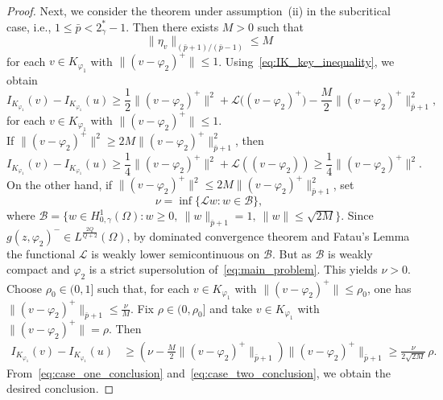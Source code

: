 \documentclass[11pt]{article}
\newcommand{\spacegr}{H^{1}_{0,\gamma}(\Omega)}
\begin{document}
\begin{proof}
Next, we consider the theorem under assumption~\textnormal{(ii)} in the subcritical case, i.e., $1 \le \bar{p} < 2_{\gamma}^{*}-1$. Then there exists $M>0$ such that
\begin{equation*}
\| \eta_{v} \|_{(\bar{p}+1)/(\bar{p}-1)} \le M
\end{equation*}
for each $v \in K_{\varphi_1}$ with $\bigl\| (v-\varphi_2)^{+} \bigr\| \le 1$. Using~\eqref{eq:IK_key_inequality}, we obtain
\begin{equation*}
I_{K_{\varphi_1}}(v) - I_{K_{\varphi_1}}(u)
\ge \frac{1}{2} \bigl\| (v-\varphi_2)^{+} \bigr\|^{2}
+ \mathcal{L}\bigl( (v-\varphi_2)^{+} \bigr)
- \frac{M}{2} \bigl\| (v-\varphi_2)^{+} \bigr\|_{\bar{p}+1}^{2},
\end{equation*}
for each $v \in K_{\varphi_1}$ with $\bigl\| (v-\varphi_2)^{+} \bigr\| \le 1$. \\
If $\bigl\| (v-\varphi_2)^{+} \bigr\|^{2} \ge 2M \bigl\| (v-\varphi_2)^{+} \bigr\|_{\bar{p}+1}^{2}$, then 
\begin{equation}
\label{eq:case_one_conclusion}
I_{K_{\varphi_1}}(v) - I_{K_{\varphi_1}}(u)
\ge \frac{1}{4} \bigl\| (v-\varphi_2)^{+} \bigr\|^{2} + \mathcal{L}((v-\varphi_2)) 
\ge \frac{1}{4} \bigl\| (v-\varphi_2)^{+} \bigr\|^{2}.
\end{equation}
On the other hand, if $\bigl\| (v-\varphi_2)^{+} \bigr\|^{2} \le 2M \bigl\| (v-\varphi_2)^{+} \bigr\|_{\bar{p}+1}^{2}$, set
\begin{equation*}
\nu = \inf \{ \mathcal{L}w : w \in \mathcal{B} \},
\end{equation*}
where $\mathcal{B} = \{ w \in \spacegr : w \ge 0,\ \| w \|_{\bar{p}+1} = 1,\ \| w \| \le \sqrt{2M} \}$. Since $g(z,\varphi_2)^{-} \in L^{\frac{2Q}{Q+2}}(\Omega)$, by dominated convergence theorem and Fatau's Lemma the functional $\mathcal{L}$ is weakly lower semicontinuous on $\mathcal{B}$. But as $\mathcal{B}$ is weakly compact and  $\varphi_2$ is a strict supersolution of~\eqref{eq:main_problem}. This yields $\nu>0$. \\Choose $\rho_0 \in (0,1]$ such that, for each $v \in K_{\varphi_1}$ with $\bigl\| (v-\varphi_2)^{+} \bigr\| \le \rho_0$, one has $\bigl\| (v-\varphi_2)^{+} \bigr\|_{\bar{p}+1} \le \frac{\nu}{M}$. Fix $\rho \in (0,\rho_0]$ and take $v \in K_{\varphi_1}$ with $\bigl\| (v-\varphi_2)^{+} \bigr\| = \rho$. Then
\begin{equation}
\label{eq:case_two_conclusion}
\begin{aligned}
I_{K_{\varphi_1}}(v) - I_{K_{\varphi_1}}(u)
& \ge \left( \nu - \frac{M}{2} \bigl\| (v-\varphi_2)^{+} \bigr\|_{\bar{p}+1} \right)
      \bigl\| (v-\varphi_2)^{+} \bigr\|_{\bar{p}+1} \ge \frac{\nu}{2\sqrt{2M}}\, \rho .
\end{aligned}
\end{equation}
From~\eqref{eq:case_one_conclusion} and~\eqref{eq:case_two_conclusion}, we obtain the desired conclusion.


\end{proof}
\end{document}
